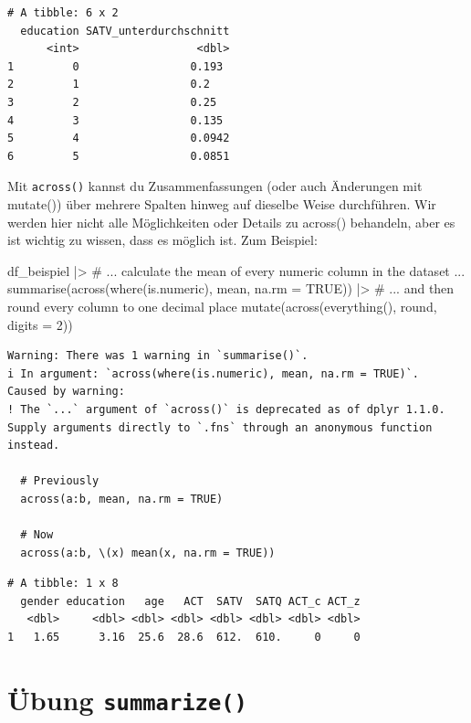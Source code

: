 \documentclass[
  letterpaper,
  DIV=11,
  numbers=noendperiod]{scrreprt}
\newenvironment{Shaded}{\begin{snugshade}}{\end{snugshade}}
\newcommand{\AttributeTok}[1]{\textcolor[rgb]{0.40,0.45,0.13}{#1}}
\newcommand{\CommentTok}[1]{\textcolor[rgb]{0.37,0.37,0.37}{#1}}
\newcommand{\ConstantTok}[1]{\textcolor[rgb]{0.56,0.35,0.01}{#1}}
\newcommand{\DecValTok}[1]{\textcolor[rgb]{0.68,0.00,0.00}{#1}}
\newcommand{\FunctionTok}[1]{\textcolor[rgb]{0.28,0.35,0.67}{#1}}
\newcommand{\NormalTok}[1]{\textcolor[rgb]{0.00,0.23,0.31}{#1}}
\newcommand{\SpecialCharTok}[1]{\textcolor[rgb]{0.37,0.37,0.37}{#1}}
\begin{document}
\begin{verbatim}
# A tibble: 6 x 2
  education SATV_unterdurchschnitt
      <int>                  <dbl>
1         0                 0.193 
2         1                 0.2   
3         2                 0.25  
4         3                 0.135 
5         4                 0.0942
6         5                 0.0851
\end{verbatim}

Mit \texttt{across()} kannst du Zusammenfassungen (oder auch Änderungen
mit mutate()) über mehrere Spalten hinweg auf dieselbe Weise
durchführen. Wir werden hier nicht alle Möglichkeiten oder Details zu
across() behandeln, aber es ist wichtig zu wissen, dass es möglich ist.
Zum Beispiel:

\begin{Shaded}
\begin{Highlighting}[]
\NormalTok{df\_beispiel }\SpecialCharTok{|\textgreater{}} 
  \CommentTok{\# ... calculate the mean of every numeric column in the dataset ...}
  \FunctionTok{summarise}\NormalTok{(}\FunctionTok{across}\NormalTok{(}\FunctionTok{where}\NormalTok{(is.numeric), mean, }\AttributeTok{na.rm =} \ConstantTok{TRUE}\NormalTok{)) }\SpecialCharTok{|\textgreater{}} 
  \CommentTok{\# ... and then round every column to one decimal place}
  \FunctionTok{mutate}\NormalTok{(}\FunctionTok{across}\NormalTok{(}\FunctionTok{everything}\NormalTok{(), round, }\AttributeTok{digits =} \DecValTok{2}\NormalTok{))}
\end{Highlighting}
\end{Shaded}

\begin{verbatim}
Warning: There was 1 warning in `summarise()`.
i In argument: `across(where(is.numeric), mean, na.rm = TRUE)`.
Caused by warning:
! The `...` argument of `across()` is deprecated as of dplyr 1.1.0.
Supply arguments directly to `.fns` through an anonymous function instead.

  # Previously
  across(a:b, mean, na.rm = TRUE)

  # Now
  across(a:b, \(x) mean(x, na.rm = TRUE))
\end{verbatim}

\begin{verbatim}
# A tibble: 1 x 8
  gender education   age   ACT  SATV  SATQ ACT_c ACT_z
   <dbl>     <dbl> <dbl> <dbl> <dbl> <dbl> <dbl> <dbl>
1   1.65      3.16  25.6  28.6  612.  610.     0     0
\end{verbatim}

\section{\texorpdfstring{Übung
\texttt{summarize()}}{Übung summarize()}}\label{uxfcbung-summarize}
\end{document}
